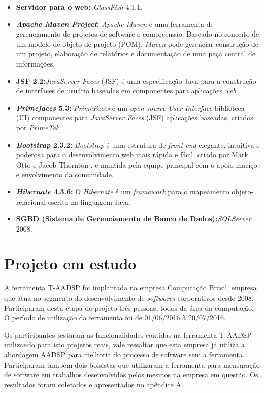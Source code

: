 \documentclass{acm_proc_article-sp}
\begin{document}
\begin{itemize}
\item \textbf{Servidor para o web:} \textit{GlassFish} 4.1.1. 
\item \textbf{\textit{Apache Maven Project}:} \textit{Apache Maven} é uma ferramenta de gerenciamento de projetos de software e compreensão. Baseado no conceito de um modelo de objeto de projeto (POM), \textit{Maven} pode gerenciar construção de um projeto, elaboração de relatórios e documentação de uma peça central de informações.
\item \textbf{JSF 2.2:}\textit{JavaServer Faces} (JSF) é uma especificação Java para a construção de interfaces de usuário baseadas em componentes para aplicações \textit{web}.
\item \textbf{\textit{Primefaces} 5.3:} \textit{PrimeFaces} é um \textit{open source User Interface} biblioteca (UI) componentes para \textit{JavaServer Faces} (JSF) aplicações baseadas, criados por \textit{PrimeTek}.  
\item \textbf{\textit{Bootstrap} 2.3.2:} \textit{Bootstrap} é uma estrutura de \textit{front-end} elegante, intuitiva e poderosa para o desenvolvimento web mais rápida e fácil, criado por Mark Otto e Jacob Thornton , e mantida pela equipe principal com o apoio maciço e envolvimento da comunidade. 
\item \textbf{\textit{Hibernate} 4.3.6:} O \textit{Hibernate} é um \textit{framework} para o mapeamento objeto-relacional escrito na linguagem Java. 
\item \textbf{SGBD (Sistema de Gerenciamento de Banco de Dados):}\textit{SQLServer} 2008. 
\end{itemize}


\section{Projeto em estudo}
A ferramenta T-AADSP foi implantada na empresa Computação Brasil, empresa que atua no segmento do desenvolvimento de \textit{softwares} corporativos desde 2008. Participaram desta etapa do projeto três pessoas, todos da área da computação. O período de utilização da ferramenta foi de 01/06/2016 à 20/07/2016. 

Os participantes testaram as funcionalidades contidas na ferramenta T-AADSP utilizando para isto projetos reais, vale ressaltar que esta empresa já utiliza a abordagem AADSP para melhoria do processo de software sem a ferramenta. Participaram também dois bolsistas que utilizaram a ferramenta para mensuração de software em trabalhos desenvolvidos pelos mesmos na empresa em questão. Os resultados foram coletados e apresentados no apêndice A.
\end{document}
